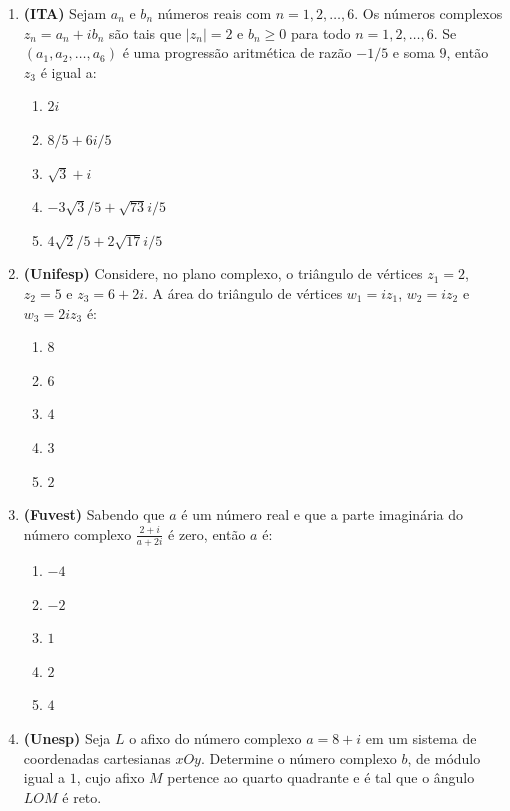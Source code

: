 \documentclass[12pt,a4paper]{article}
\begin{document}
\begin{enumerate}[label=\textbf{\arabic*.}, leftmargin=*, itemsep=1.2em]

    \item \textbf{(ITA)} Sejam $a_n$ e $b_n$ números reais com $n = 1, 2, \dots, 6$. Os números complexos $z_n = a_n + i b_n$ são tais que $|z_n| = 2$ e $b_n \ge 0$ para todo $n = 1, 2, \dots, 6$. Se $(a_1, a_2, \dots, a_6)$ é uma progressão aritmética de razão $-1/5$ e soma $9$, então $z_3$ é igual a:
    \begin{enumerate}[label=\alph*)]
        \item $2i$
        \item $8/5 + 6i/5$
        \item $\sqrt{3} + i$
        \item $-3\sqrt{3}/5 + \sqrt{73}i/5$
        \item $4\sqrt{2}/5 + 2\sqrt{17}i/5$
    \end{enumerate}

    \item \textbf{(Unifesp)} Considere, no plano complexo, o triângulo de vértices $z_1 = 2$, $z_2 = 5$ e $z_3 = 6 + 2i$. A área do triângulo de vértices $w_1 = i z_1$, $w_2 = i z_2$ e $w_3 = 2i z_3$ é:
    \begin{enumerate}[label=\alph*)]
        \item $8$
        \item $6$
        \item $4$
        \item $3$
        \item $2$
    \end{enumerate}

    \item \textbf{(Fuvest)} Sabendo que $a$ é um número real e que a parte imaginária do número complexo $\frac{2+i}{a+2i}$ é zero, então $a$ é:
    \begin{enumerate}[label=\alph*)]
        \item $-4$
        \item $-2$
        \item $1$
        \item $2$
        \item $4$
    \end{enumerate}

    \item \textbf{(Unesp)} Seja $L$ o afixo do número complexo $a = 8 + i$ em um sistema de coordenadas cartesianas $xOy$. Determine o número complexo $b$, de módulo igual a $1$, cujo afixo $M$ pertence ao quarto quadrante e é tal que o ângulo $LOM$ é reto.


\end{enumerate}
\end{document}
